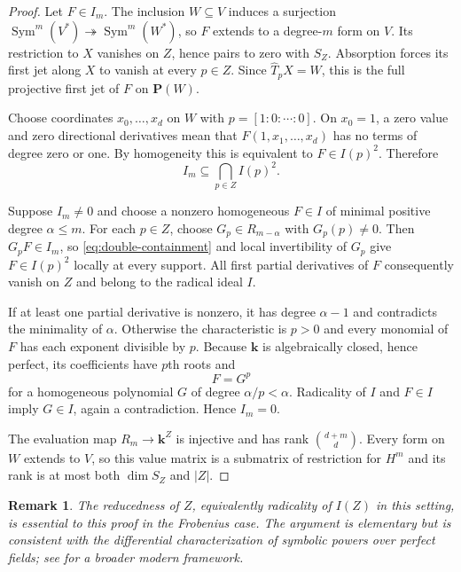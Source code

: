 \documentclass[11pt]{article}
\newtheorem{remark}[theorem]{Remark}
\newcommand{\PP}{\mathbf P}
\newcommand{\kk}{\mathbf k}
\newcommand{\Sym}{\operatorname{Sym}}
\begin{document}
\begin{proof}
Let $F\in I_m$.  The inclusion $W\subseteq V$ induces a surjection
$\Sym^m(V^*)\twoheadrightarrow\Sym^m(W^*)$, so $F$ extends to a degree-$m$
form on $V$.  Its restriction to $X$ vanishes on $Z$, hence pairs to zero
with $S_Z$.  Absorption forces its first jet along $X$ to vanish at every
$p\in Z$.  Since $\widehat T_pX=W$, this is the full projective first jet of
$F$ on $\PP(W)$.

Choose coordinates $x_0,\ldots,x_d$ on $W$ with
$p=[1:0:\cdots:0]$.  On $x_0=1$, a zero value and zero directional
derivatives mean that $F(1,x_1,\ldots,x_d)$ has no terms of degree zero or
one.  By homogeneity this is equivalent to $F\in I(p)^2$.  Therefore
\begin{equation}\label{eq:double-containment}
 I_m\subseteq\bigcap_{p\in Z}I(p)^2.
\end{equation}

Suppose $I_m\neq0$ and choose a nonzero homogeneous $F\in I$ of minimal
positive degree $\alpha\leq m$.  For each $p\in Z$, choose
$G_p\in R_{m-\alpha}$ with $G_p(p)\neq0$.  Then $G_pF\in I_m$, so
\eqref{eq:double-containment} and local invertibility of $G_p$ give
$F\in I(p)^2$ locally at every support.  All first partial derivatives of
$F$ consequently vanish on $Z$ and belong to the radical ideal $I$.

If at least one partial derivative is nonzero, it has degree $\alpha-1$ and
contradicts the minimality of $\alpha$.  Otherwise the characteristic is
$p>0$ and every monomial of $F$ has each exponent divisible by $p$.  Because
$\kk$ is algebraically closed, hence perfect, its coefficients have $p$th
roots and
\[
 F=G^p
\]
for a homogeneous polynomial $G$ of degree $\alpha/p<\alpha$.  Radicality of
$I$ and $F\in I$ imply $G\in I$, again a contradiction.  Hence $I_m=0$.

The evaluation map $R_m\to\kk^Z$ is injective and has rank
$\binom{d+m}{d}$.  Every form on $W$ extends to $V$, so this value matrix is
a submatrix of restriction for $H^m$ and its rank is at most both
$\dim S_Z$ and $|Z|$.
\end{proof}

\begin{remark}
The reducedness of $Z$, equivalently radicality of $I(Z)$ in this setting,
is essential to this proof in the Frobenius case.  The argument is elementary but is
consistent with the differential characterization of symbolic powers over
perfect fields; see \cite{DeStefaniGrifoJeffries2020} for a broader modern
framework.
\end{remark}
\end{document}
